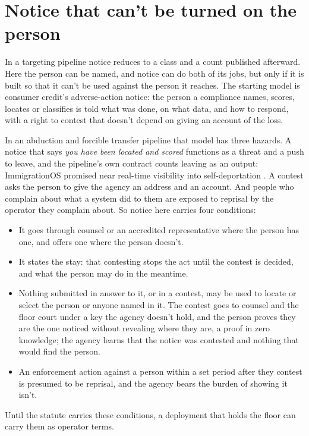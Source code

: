 \section{Notice that can't be turned on the person}
\label{sec:11.6}
In a targeting pipeline notice reduces to a class and a count published afterward. Here the person can be named, and notice can do both of its jobs, but only if it is built so that it can't be used against the person it reaches. The starting model is consumer credit's adverse-action notice: the person a compliance names, scores, locates or classifies is told what was done, on what data, and how to respond, with a right to contest that doesn't depend on giving an account of the loss.

In an abduction and forcible transfer pipeline that model has three hazards. A notice that says \emph{you have been located and scored} functions as a threat and a push to leave, and the pipeline's own contract counts leaving as an output: ImmigrationOS promised near real-time visibility into self-deportation \autocite{Ho2025ImmigrationOS}. A contest asks the person to give the agency an address and an account. And people who complain about what a system did to them are exposed to reprisal by the operator they complain about. So notice here carries four conditions:

\begin{itemize}
\item It goes through counsel or an accredited representative where the person has one, and offers one where the person doesn't.
\item It states the stay: that contesting stops the act until the contest is decided, and what the person may do in the meantime.
\item Nothing submitted in answer to it, or in a contest, may be used to locate or select the person or anyone named in it. The contest goes to counsel and the floor court under a key the agency doesn't hold, and the person proves they are the one noticed without revealing where they are, a proof in zero knowledge; the agency learns that the notice was contested and nothing that would find the person.
\item An enforcement action against a person within a set period after they contest is presumed to be reprisal, and the agency bears the burden of showing it isn't.
\end{itemize}

Until the statute carries these conditions, a deployment that holds the floor can carry them as operator terms.
